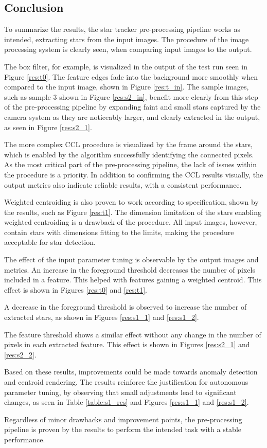 \documentclass[12pt]{report}
\begin{document}
\subsection{Conclusion}
To summarize the results, the star tracker pre-processing pipeline works as intended, extracting stars from the input images. The procedure of the image processing system is clearly seen, when comparing input images to the output. 
\par
The box filter, for example, is visualized in the output of the test run seen in Figure \ref{res:t0}. The feature edges fade into the background more smoothly when compared to the input image, shown in Figure \ref{res:t_in}. The sample images, such as sample 3 shown in Figure \ref{res:s2_in}, benefit more clearly from this step of the pre-processing pipeline by expanding faint and small stars captured by the camera system as they are noticeably larger, and clearly extracted in the output, as seen in Figure \ref{res:s2_1}.
\par
The more complex CCL procedure is visualized by the frame around the stars, which is enabled by the algorithm successfully identifying the connected pixels. As the most critical part of the pre-processing pipeline, the lack of issues within the procedure is a priority. In addition to confirming the CCL results visually, the output metrics also indicate reliable results, with a consistent performance.
\par  
Weighted centroiding is also proven to work according to specification, shown by the results, such as Figure \ref{res:t1}. The dimension limitation of the stars enabling weighted centroiding is a drawback of the procedure. All input images, however, contain stars with dimensions fitting to the limits, making the procedure acceptable for star detection.
\par
The effect of the input parameter tuning is observable by the output images and metrics. An increase in the foreground threshold decreases the number of pixels included in a feature. This helped with features gaining a weighted centroid. This effect is shown in Figures \ref{res:t0} and \ref{res:t1}.
\par
A decrease in the foreground threshold is observed to increase the number of extracted stars, as shown in Figures \ref{res:s1_1} and \ref{res:s1_2}.
\par
The feature threshold shows a similar effect without any change in the number of pixels in each extracted feature. This effect is shown in Figures \ref{res:s2_1} and \ref{res:s2_2}.
\par
Based on these results, improvements could be made towards anomaly detection and centroid rendering. The results reinforce the justification for autonomous parameter tuning, by observing that small adjustments lead to significant changes, as seen in Table \ref{table:s1_res} and Figures \ref{res:s1_1} and \ref{res:s1_2}.
\par
Regardless of minor drawbacks and improvement points, the pre-processing pipeline is proven by the results to perform the intended task with a stable performance.
\end{document}
